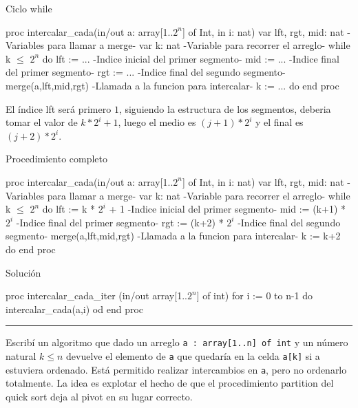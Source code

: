 \begin{codebox}{Ciclo while}
\begin{pascallike}
proc intercalar_cada(in/out a: array[1..$2^n$] of Int, in i: nat)
    var lft, rgt, mid: nat {-Variables para llamar a merge-}
    var k: nat {-Variable para recorrer el arreglo-}
    while k $\leq$ $2^n$ do
    lft := ... {-Indice inicial del primer segmento-}
    mid := ... {-Indice final del primer segmento-}
    rgt := ... {-Indice final del segundo segmento-}
    merge(a,lft,mid,rgt) {-Llamada a la funcion para intercalar-}
    k := ...
    do
end proc
\end{pascallike}
\end{codebox}
El índice lft será primero $1$, siguiendo la estructura de los segmentos, deberia tomar el valor de $k * 2^i + 1$, luego el medio es $(j+1) * 2^i$ y el final es $(j+2) * 2^i$.
\begin{codebox}{Procedimiento completo}
\begin{pascallike}
proc intercalar_cada(in/out a: array[1..$2^n$] of Int, in i: nat)
    var lft, rgt, mid: nat {-Variables para llamar a merge-}
    var k: nat {-Variable para recorrer el arreglo-}
    while k $\leq$ $2^n$ do
    lft := k * $2^i$ + 1 {-Indice inicial del primer segmento-}
    mid := (k+1) * $2^i$ {-Indice final del primer segmento-}
    rgt := (k+2) * $2^i$ {-Indice final del segundo segmento-}
    merge(a,lft,mid,rgt) {-Llamada a la funcion para intercalar-}
    k := k+2
    do
end proc
\end{pascallike}
\end{codebox}
\begin{codebox}{Solución}
\begin{pascallike}
proc intercalar_cada_iter (in/out array[1..$2^n$] of int)
    for i := 0 to n-1 do
    intercalar_cada(a,i)
    od
end proc
\end{pascallike}
\end{codebox}

\begin{center}
    \rule{\textwidth}{0.4pt}
\end{center}

Escribí un algoritmo que dado un arreglo \texttt{a : array[1..n] of int} y un número natural $k \leq n$ devuelve el elemento de \texttt{a} que quedaría en la celda \texttt{a[k]} si a estuviera ordenado. Está permitido realizar intercambios en \texttt{a}, pero no ordenarlo totalmente. La idea es explotar el hecho de que el procedimiento partition del quick sort deja al pivot en su lugar correcto.

